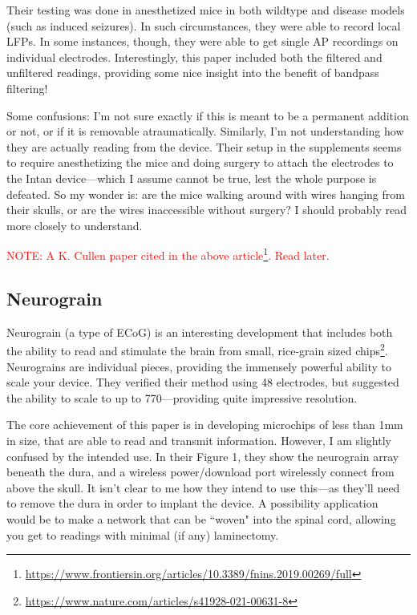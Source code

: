 \documentclass[12pt]{report}
\begin{document}
Their testing was done in anesthetized mice in both wildtype and disease models (such as induced seizures). In such circumstances, they were able to record local LFPs. In some instances, though, they were able to get single AP recordings on individual electrodes. Interestingly, this paper included both the filtered and unfiltered readings, providing some nice insight into the benefit of bandpass filtering!\newline

Some confusions: I'm not sure exactly if this is meant to be a permanent addition or not, or if it is removable atraumatically. Similarly, I'm not understanding how they are actually reading from the device. Their setup in the supplements seems to require anesthetizing the mice and doing surgery to attach the electrodes to the Intan device---which I assume cannot be true, lest the whole purpose is defeated. So my wonder is: are the mice walking around with wires hanging from their skulls, or are the wires inaccessible without surgery? I should probably read more closely to understand.\newline


\textcolor{red}{NOTE: A K. Cullen paper cited in the above article\footnote{\url{https://www.frontiersin.org/articles/10.3389/fnins.2019.00269/full}}. Read later.}

\subsection{Neurograin}

Neurograin (a type of ECoG) is an interesting development that includes both the ability to read and stimulate the brain from small, rice-grain sized chips\footnote{\url{https://www.nature.com/articles/s41928-021-00631-8}}. Neurograins are individual pieces, providing the immensely powerful ability to scale your device. They verified their method using 48 electrodes, but suggested the ability to scale to up to 770---providing quite impressive resolution.\newline

The core achievement of this paper is in developing microchips of less than 1mm in size, that are able to read and transmit information. However, I am slightly confused by the intended use. In their Figure 1, they show the neurograin array beneath the dura, and a wireless power/download port wirelessly connect from above the skull. It isn't clear to me how they intend to use this---as they'll need to remove the dura in order to implant the device. A possibility application would be to make a network that can be ``woven" into the spinal cord, allowing you get to readings with minimal (if any) laminectomy. \newline
\end{document}
